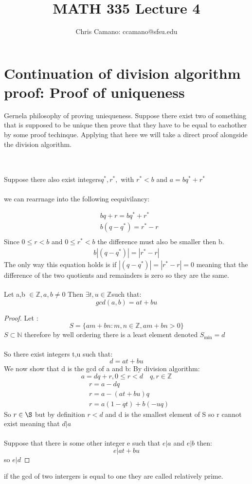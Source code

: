 \documentclass[12pt]{article}
\author{Chris Camano: ccamano@sfsu.edu}
\title{MATH 335  Lecture 4 }
\date
\newcommand{\sect}[1]{\section*{#1}}
\newcommand{\Z}{\mathbb{Z}}
\newcommand{\N}{\mathbb{N}}
\theoremstyle{definition}
\theoremstyle{remark}
\numberwithin{equation}{section}
\begin{document}
\maketitle
\sect{Continuation of division algorithm proof: Proof of uniqueness}
Gernela philosophy of proving uniequeness. Suppose there exist two of something that is supposed to be unique then prove that they have to be equal to eachother by some proof techinque. Applying that here we will take a direct proof alongside the division algorithm.

\\\\
Suppose there also exist integers$q^*,r^*,$ with $r^*<b$ and $a=bq^*+r^*$\\\\
we can rearrnage into the following eequivilancy:

\begin{align*}
  &bq+r=bq^*+r^*\\
  &b(q-q^*)=r^*-r\\
\end{align*}
Since $0\leq r<b$ and $0\leq r^*<b$ the difference must also be smaller then b.
\begin{align*}
  b|(q-q^*)|=|r^*-r|
\end{align*}
The only way this equation holds is if $|(q-q^*)|=|r^*-r|=0$ meaning that the difference of the two quotients and remainders is zero so they are the same. \\\\
\thm Let a,b $\in \Z, a,b\neq 0$ Then $\exists t,u\in \Z$such that:
\[
  gcd(a,b)=at+bu
\]
\begin{proof}
  Let :
  \[
    S=\{am+bn: m,n\in \Z , am+bn>0\}
  \]
  $S\subset \N$ therefore by well ordering there is a least element denoted $S_{\min}=d$\\\\
  So there exist integers t,u such that:
  \[
    d=at+bu
  \]
  We now show that d is the gcd of a and b:
  By division algorithm:
  \[
    a=dq+r,0\leq r <d\quad q,r \in \Z
  \]
  \begin{align*}
    &r=a-dq\\
    &r=a-(at+bu)q\\
    &r=a(1-qt)+b(-uq)
  \end{align*}
  So $r\in \S$ but by definition $ r<d$ and d is the smallest element of S so r cannot exist meaning that $d|a$\\\\
  Suppose that there is some other integer e such that $e|a$ and $e|b$ then:
  \[
    e|at+bu
  \]
  so $e|d$
\end{proof}
 if the gcd of two intergers is equal to one they are called relatively prime. 
\end{document}
